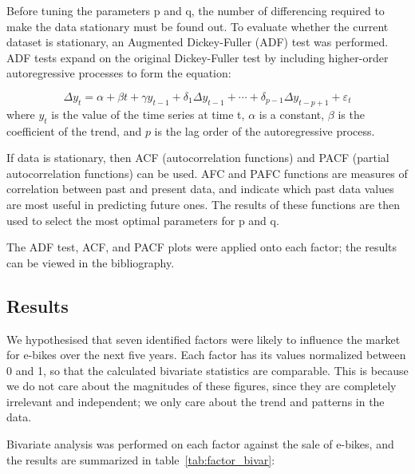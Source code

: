 Before tuning the parameters p and q, the number of differencing required to make the
data stationary must be found out. To evaluate whether the current dataset is stationary, an
Augmented Dickey-Fuller (ADF) test was performed.
ADF tests expand on the original Dickey-Fuller test by including higher-order autoregressive
processes to form the equation:


\begin{equation}
    \Delta y_{t}=\alpha +\beta t+\gamma y_{t-1}+\delta _{1}\Delta y_{t-1}+\cdots +\delta _{p-1}\Delta y_{t-p+1}+\varepsilon _{t}
\end{equation}
%
where
${y_{t}}$ is the value of the time series at time t,
${\alpha}$ is a constant,
${\beta}$ is the coefficient of the trend, and
$p$ is the lag order of the autoregressive process.

If data is stationary, then ACF (autocorrelation functions) and PACF (partial autocorrelation functions) can be used.
AFC and PAFC functions are measures of correlation between past
and present data, and indicate which past data values are most useful in predicting future
ones. The results of these functions are then used to select the most optimal parameters for
p and q.

The ADF test, ACF, and PACF plots were applied onto each factor; the results can be viewed in the bibliography.

\subsection{Results}

We hypothesised that seven identified factors were likely to influence the market for e-bikes over the next five years.
Each factor has its values normalized between 0 and 1, so that the calculated bivariate statistics are comparable.
This is because we do not care about the magnitudes of these figures, since they are completely irrelevant and independent; we only care about the trend and patterns in the data.

Bivariate analysis was performed on each factor against the sale of e-bikes, and the results are summarized in table~\ref{tab:factor_bivar}:


